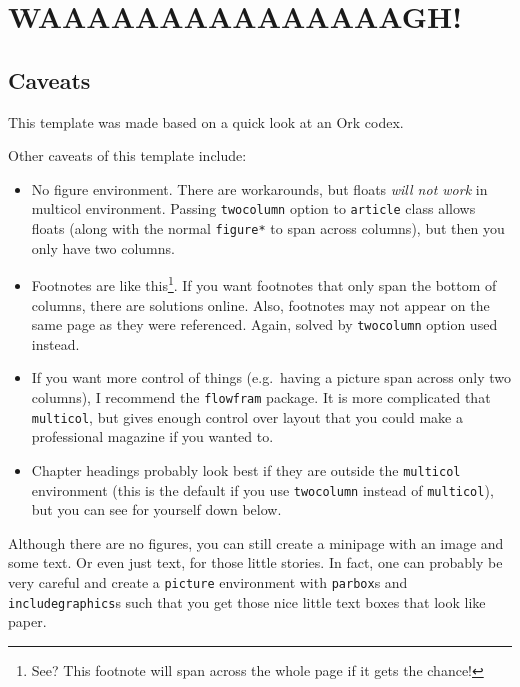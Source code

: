 \documentclass{report}
\begin{document}
\chapter{WAAAAAAAAAAAAAAAGH!}

\begin{multicols}{3}

\section{Caveats}\label{sec:caveats}%
This template was made based on a quick look at an Ork codex.

Other caveats of this template include:
\begin{itemize}
\item No figure environment. There are workarounds, but floats \emph{will not work} in multicol environment. Passing \verb=twocolumn= option to \verb=article= class allows floats (along with the normal \verb=figure*= to span across columns), but then you only have two columns.
\item Footnotes are like this\footnote{See? This footnote will span across the whole page if it gets the chance!}. If you want footnotes that only span the bottom of columns, there are solutions online. Also, footnotes may not appear on the same page as they were referenced. Again, solved by \verb=twocolumn= option used instead.
\item If you want more control of things (e.g.\ having a picture span across only two columns), I recommend the \verb=flowfram= package. It is more complicated that \verb=multicol=, but gives enough control over layout that you could make a professional magazine if you wanted to.
\item Chapter headings probably look best if they are outside the \verb=multicol= environment (this is the default if you use \verb=twocolumn= instead of \verb=multicol=), but you can see for yourself down below.
\end{itemize}

Although there are no figures, you can still create a minipage with an image and some text. Or even just text, for those little stories. In fact, one can probably be very careful and create a \verb=picture= environment with \verb=parbox=s and \verb=includegraphics=s such that you get those nice little text boxes that look like paper.


\end{multicols}
\end{document}
